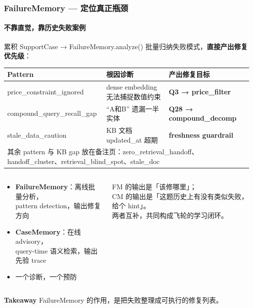 \documentclass[aspectratio=169,10pt]{beamer}
\newcommand{\takeaway}[1]{%
  \vfill%
  \begin{tcolorbox}[
    colback=Ctakebg, colframe=Ctakebg,
    arc=0pt, boxrule=0pt,
    left=7pt, right=7pt, top=4pt, bottom=4pt,
    width=\textwidth, nobeforeafter
  ]%
    {\scriptsize\color{white}\textbf{Takeaway}\enspace%
     \color{white!88!Ctakebg}#1}%
  \end{tcolorbox}%
}
\newcommand{\hi}[1]{{\bfseries\color{Cgreen}#1}}      %
\newcommand{\mono}[1]{{\ttfamily\small\color{Cblue!90!black}#1}}  %
\begin{document}
\begin{frame}
\frametitle{FailureMemory — 定位真正瓶颈}
\framesubtitle{不靠直觉，靠历史失败案例}

\begin{tcolorbox}[tcblue]
\footnotesize 累积 SupportCase → \mono{FailureMemory.analyze()} 批量归纳失败模式，\textbf{直接产出修复优先级}：
\end{tcolorbox}

\vspace{0.12cm}
{\footnotesize\renewcommand{\arraystretch}{1.12}
\begin{tabularx}{\textwidth}{lXX}
\toprule
\bfseries Pattern & \bfseries 根因诊断 & \bfseries 产出修复目标 \\
\midrule
\rowcolor{Cgraylt}
\mono{price\_constraint\_ignored}  & dense embedding 无法捕捉数值约束 & \hi{Q3 → price\_filter} \\
\mono{compound\_query\_recall\_gap} & ``A和B'' 遗漏一半实体 & \hi{Q28 → compound\_decomp} \\
\rowcolor{Cgraylt}
\mono{stale\_data\_caution}        & KB 文档 \mono{updated\_at} 超期 & \hi{freshness guardrail} \\
\bottomrule
\multicolumn{3}{l}{\scriptsize 其余 pattern 与 KB gap 放在备注页：\mono{zero\_retrieval\_handoff}、\mono{handoff\_cluster}、\mono{retrieval\_blind\_spot}、\mono{stale\_doc}}
\end{tabularx}}

\vspace{0.12cm}
\begin{columns}[T]
\begin{tcolorbox}[tcgray, title={\color{Ctextdark}FM 与 CM 的分工}]
\footnotesize\begin{itemize}\setlength\itemsep{0.12em}
  \item \textbf{FailureMemory}：离线批量分析，\\pattern detection，输出修复方向
  \item \textbf{CaseMemory}：在线 advisory，\\query-time 语义检索，输出先验 trace
  \item {\color{Cmuted}一个诊断，一个预防}
\end{itemize}
\end{tcolorbox}

\begin{tcolorbox}[tcblue]
\footnotesize FM 的输出是「该修哪里」；\\CM 的输出是「这题历史上有没有类似失败，给个 hint」。\\[0.15em]
两者互补，共同构成飞轮的学习闭环。
\end{tcolorbox}
\end{columns}

\takeaway{FailureMemory 的作用，是把失败整理成可执行的修复列表。}
\end{frame}
\end{document}
